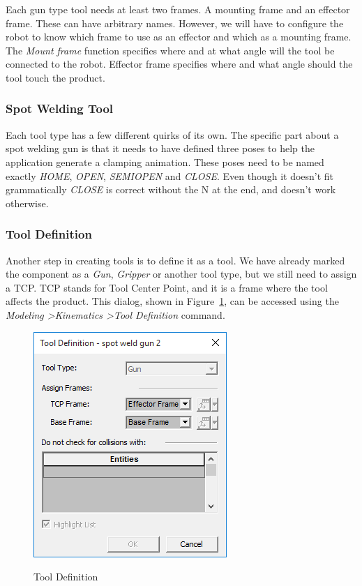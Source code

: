 Each gun type tool needs at least two frames. 
A mounting frame and an effector frame.
These can have arbitrary names. 
However, we will have to configure the robot to know which frame to use as an effector and which as a mounting frame.
The \emph{Mount frame} function specifies where and at what angle will the tool be connected to the robot.
Effector frame specifies where and what angle should the tool touch the product. \\

\subsubsection{Spot Welding Tool}
Each tool type has a few different quirks of its own.
The specific part about a spot welding gun is that it needs to have defined three poses to help the application generate a clamping animation.
These poses need to be named exactly \emph{HOME}, \emph{OPEN}, \emph{SEMIOPEN} and \emph{CLOSE}.
Even though it doesn't fit grammatically \emph{CLOSE} is correct without the N at the end, and doesn't work otherwise. \\

\subsubsection{Tool Definition}
Another step in creating tools is to define it as a tool.
We have already marked the component as a \emph{Gun}, \emph{Gripper} or another tool type, but we still need to assign a TCP. 
TCP stands for Tool Center Point, and it is a frame where the tool affects the product.
This dialog, shown in Figure~\ref{fig:ToolDefinition}, can be accessed using the \emph{Modeling \textgreater Kinematics \textgreater Tool Definition} command. \\

\begin{figure}[H]
    \caption{Tool Definition}
    \centering
    \includegraphics{tool_definition}
    \label{fig:ToolDefinition}
\end{figure}


